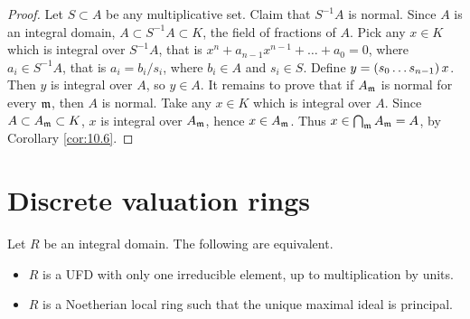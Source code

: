 \begin{proof}
Let $ S \subset A $ be any multiplicative set. Claim that $ S^{-1}A $ is normal. Since $ A $ is an integral domain, $ A \subset S^{-1}A \subset K $, the field of fractions of $ A $. Pick any $ x \in K $ which is integral over $ S^{-1}A $, that is $ x^n + a_{n - 1}x^{n - 1} + \dots + a_0 = 0 $, where $ a_i \in S^{-1}A $, that is $ a_i = b_i / s_i $, where $ b_i \in A $ and $ s_i \in S $. Define $ y = \br{s_0 \dots s_{n - 1}}x $. Then $ y $ is integral over $ A $, so $ y \in A $. It remains to prove that if $ A_{\mathfrak{m}} $ is normal for every $ \mathfrak{m} $, then $ A $ is normal. Take any $ x \in K $ which is integral over $ A $. Since $ A \subset A_{\mathfrak{m}} \subset K $, $ x $ is integral over $ A_{\mathfrak{m}} $, hence $ x \in A_{\mathfrak{m}} $. Thus $ x \in \bigcap_{\mathfrak{m}} A_{\mathfrak{m}} = A $, by Corollary \ref{cor:10.6}.
\end{proof}

\pagebreak

\section{Discrete valuation rings}

\begin{theorem}
\label{thm:15.1}
Let $ R $ be an integral domain. The following are equivalent.
\begin{itemize}
\item $ R $ is a UFD with only one irreducible element, up to multiplication by units.
\item $ R $ is a Noetherian local ring such that the unique maximal ideal is principal.
\end{itemize}
\end{theorem}

